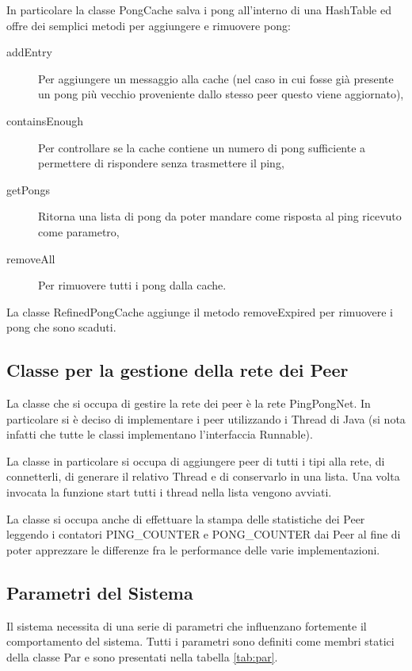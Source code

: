 \documentclass[a4paper,11pt]{article}
\begin{document}
In particolare la classe \textsf{PongCache} salva i pong all'interno di una \textsf{HashTable} ed offre dei semplici metodi per aggiungere e rimuovere pong:

\begin{description}
\item[addEntry] Per aggiungere un messaggio alla cache (nel caso in cui fosse gi\`a presente un pong pi\`u vecchio proveniente dallo stesso peer questo viene aggiornato),
\item[containsEnough] Per controllare se la cache contiene un numero di pong sufficiente a permettere di rispondere senza trasmettere il ping,
\item[getPongs] Ritorna una lista di pong da poter mandare come risposta al ping ricevuto come parametro,
\item[removeAll] Per rimuovere tutti i pong dalla cache.
\end{description}

La classe \textsf{RefinedPongCache} aggiunge il metodo \textsf{removeExpired} per rimuovere i pong che sono scaduti.

\subsection{Classe per la gestione della rete dei Peer}

La classe che si occupa di gestire la rete dei peer \`e la rete \textsf{PingPongNet}. In particolare si \`e deciso di implementare i peer utilizzando i \textsf{Thread} di Java (si nota infatti che tutte le classi implementano l'interfaccia \textsf{Runnable}).

La classe in particolare si occupa di aggiungere peer di tutti i tipi alla rete, di connetterli, di generare il relativo \textsf{Thread} e di conservarlo in una lista. Una volta invocata la funzione \textsf{start} tutti i thread nella lista vengono avviati.

La classe si occupa anche di effettuare la stampa delle statistiche dei \textsf{Peer} leggendo i contatori \textsf{PING\_COUNTER} e \textsf{PONG\_COUNTER} dai Peer al fine di poter apprezzare le differenze fra le performance delle varie implementazioni.

\subsection{Parametri del Sistema}

Il sistema necessita di una serie di parametri che influenzano fortemente il comportamento del sistema.
Tutti i parametri sono definiti come membri statici della classe \textsf{Par} e sono presentati nella tabella \ref{tab:par}.
\end{document}
